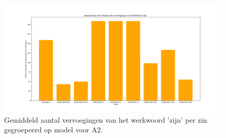 \begin{figure}
	\includegraphics[width=\linewidth]{img/boxplot-tobe-a2.png}
	\caption{Gemiddeld aantal vervoegingen van het werkwoord 'zijn' per zin gegroepeerd op model voor A2.}
	\label{img:histplot-tobe-a2}
\end{figure}